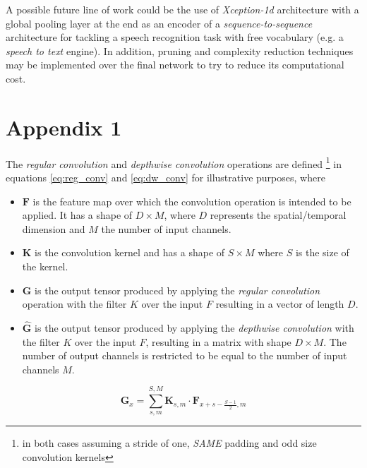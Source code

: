 \documentclass{elsarticle}
\begin{document}
A possible future line of work could be  the use of \textit{Xception-1d} architecture with a global pooling layer at the end  as an encoder of a \textit{sequence-to-sequence} architecture for tackling a speech recognition task with free vocabulary (e.g. a \textit{speech to text} engine). In addition, pruning and complexity reduction techniques may be implemented over the final network to try to reduce its computational cost.




\newpage




\newpage

\section*{Appendix 1}
The \textit{regular convolution} and \textit{depthwise convolution} operations \cite{Howard2017}  are defined \footnote{in both cases assuming a stride of one, \textit{SAME} padding and odd size convolution kernels} in equations \ref{eq:reg_conv} and  \ref{eq:dw_conv} for illustrative purposes, where 

\begin{itemize}
	\item $\mathbf{F}$ is the feature map over which the convolution operation is intended to be applied. It has a shape of $D \times M$, where $D$ represents the spatial/temporal dimension and $M$ the number of input channels.
	\item $\mathbf{K}$ is the convolution kernel and has a shape of $S \times M$ where $S$ is the size of the kernel.
	\item $\mathbf{G}$ is the output tensor produced by applying the \textit{regular convolution} operation with the filter $K$ over the input $F$ resulting in a vector of length $D$.
	\item $\hat{\mathbf{G}}$ is the output tensor produced by applying the \textit{depthwise convolution} with the filter $K$ over the input $F$, resulting in a matrix with shape $D \times M$. The number of output channels is restricted to be equal to the number of input channels $M$. 
\end{itemize}


\begin{equation}
\mathbf{G}_{x} = \sum_{s, m}^{S,M} \mathbf{K}_{s, m} \cdot \mathbf{F}_{x+s-\frac{S-1}{2}, m}
\label{eq:reg_conv}
\end{equation}
\end{document}

